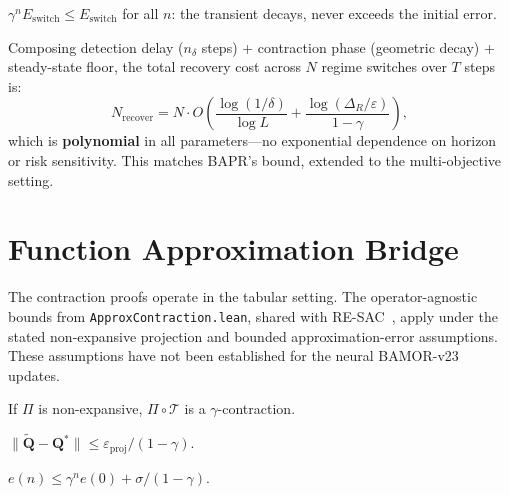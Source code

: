\begin{theorem}
$\gamma^n E_{\mathrm{switch}} \le E_{\mathrm{switch}}$ for all $n$: the transient decays, never exceeds the initial error.
\end{theorem}

\begin{remark}
Composing detection delay ($n_\delta$ steps) + contraction phase (geometric decay) + steady-state floor, the total recovery cost across $N$ regime switches over $T$ steps is:
\begin{equation}
    N_{\mathrm{recover}} = N \cdot O\left(\frac{\log(1/\delta)}{\log L} + \frac{\log(\Delta_R/\varepsilon)}{1{-}\gamma}\right),
\end{equation}
which is \textbf{polynomial} in all parameters---no exponential dependence on horizon or risk sensitivity.  This matches BAPR's bound, extended to the multi-objective setting.
\end{remark}


\section{Function Approximation Bridge}
\label{app:approx}

The contraction proofs operate in the tabular setting. The operator-agnostic bounds from \texttt{ApproxContraction.lean}, shared with RE-SAC~\cite{Zhang2025RESAC}, apply under the stated non-expansive projection and bounded approximation-error assumptions. These assumptions have not been established for the neural BAMOR-v23 updates.

\begin{theorem}
If $\Pi$ is non-expansive, $\Pi \circ \mathcal{T}$ is a $\gamma$-contraction.
\end{theorem}

\begin{theorem}
$\|\tilde{\mathbf{Q}} - \mathbf{Q}^*\| \le \varepsilon_{\mathrm{proj}}/(1{-}\gamma)$.
\end{theorem}

\begin{theorem}
$e(n) \le \gamma^n e(0) + \sigma/(1{-}\gamma)$.
\end{theorem}

